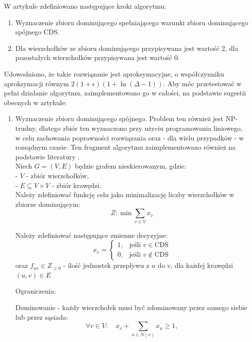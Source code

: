  W artykule zdefiniowano następujące kroki algorytmu:
\begin{enumerate}
    \item Wyznaczenie zbioru dominującego spełniającego warunki zbioru dominującego spójnego CDS.
    \item Dla wierzchołków ze zbioru dominującego przypisywana jest wartość 2, dla pozostałych wierzchołków przypisywana jest wartość 0.
\end{enumerate}

Udowodniono, że takie rozwiązanie jest aproksymacyjne, o współczynniku aproksymacji równym
$2(1+\epsilon)(1 + \ln(\Delta - 1))$. Aby móc przetestować w pełni działanie algorytmu, zaimplementowano go w całości, na podstawie sugestii obecnych w artykule:

\begin{enumerate}
    \item Wyznaczenie zbioru dominującego spójnego. Problem ten również jest NP-trudny, dlatego zbiór ten wyznaczono przy użyciu programowania liniowego, w celu zachowania poprawności rozwiązania oraz - dla wielu przypadków - w rozsądnym czasie. Ten fragment algorytmu zaimplementowano również na podstawie literatury \cite{CDS}.\\ 
    Niech \( G = (V, E) \) będzie grafem nieskierowanym, gdzie:\\
        - \( V \) - zbiór wierzchołków,\\
        - \( E \subseteq V \times V \) - zbiór krawędzi.\\

        Należy zdefiniować funkcję celu jako minimalizację liczby wierzchołków w zbiorze dominującym:
        \[
        Z: \min \sum_{v \in V} x_v
        \]

        Należy zdefiniować następujące zmienne decyzyjne:
        \[
        x_v =
        \begin{cases}
        1, & \text{jeśli } v \in \text{CDS} \\
        0, & \text{jeśli } v \notin \text{CDS}
        \end{cases}
        \]
        oraz \( f_{uv} \in {Z}_{\geq 0} \) - ilość jednostek przepływu z \( u \) do \( v \), dla każdej krawędzi \( (u, v) \in E \)

        Ograniczenia:

        Dominowanie - każdy wierzchołek musi być zdominowany przez samego siebie lub przez sąsiada:
        \[
        \forall v \in V:\quad x_v + \sum_{u \in N(v)} x_u \geq 1, \tag{1}
        \]


\end{enumerate}
